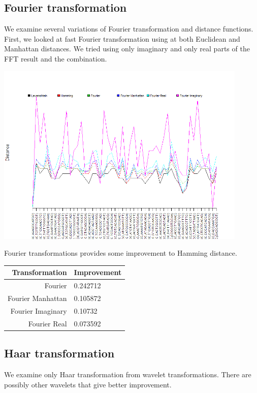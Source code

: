 \documentclass [12pt, a4]{article} %
\begin{document}
\subsection{Fourier transformation}

We examine several variations of Fourier transformation and distance functions. First, we looked at fast Fourier transformation using at both Euclidean and Manhattan distances. We tried using only imaginary and only real parts of the FFT result and the combination.

\includegraphics[width=0.9\textwidth]{img/fourier.png}

Fourier transformations provides some improvement to Hamming distance.

\begin{tabular}{ r | l }
    Transformation & Improvement \\ \hline
    Fourier           & 0.242712 \\
    Fourier Manhattan & 0.105872 \\
    Fourier Imaginary & 0.10732 \\
    Fourier Real      & 0.073592 \\
\end{tabular}

\subsection{Haar transformation}

We examine only Haar transformation from wavelet transformations. There are possibly other wavelets that give better improvement.
\end{document}
